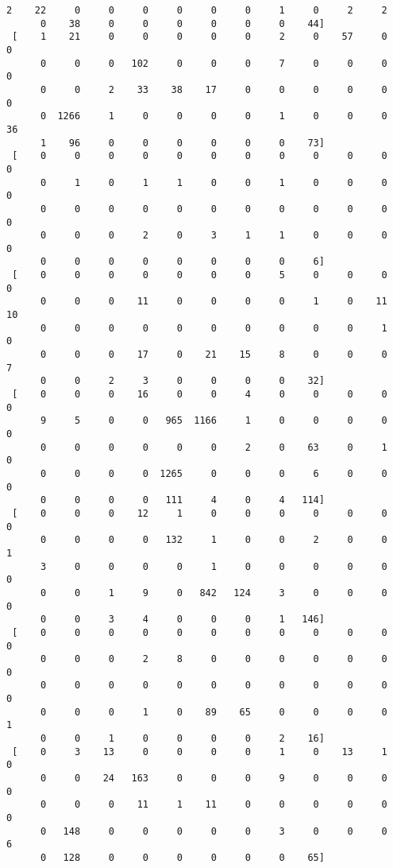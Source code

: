 \documentclass[11pt]{article}
\begin{document}
\begin{Verbatim}[commandchars=\\\{\}]
      2    22     0     0     0     0     0     0     1     0     2     2
      0    38     0     0     0     0     0     0    44]
 [    1    21     0     0     0     0     0     2     0    57     0     0
      0     0     0   102     0     0     0     7     0     0     0     0
      0     0     2    33    38    17     0     0     0     0     0     0
      0  1266     1     0     0     0     0     1     0     0     0    36
      1    96     0     0     0     0     0     0    73]
 [    0     0     0     0     0     0     0     0     0     0     0     0
      0     1     0     1     1     0     0     1     0     0     0     0
      0     0     0     0     0     0     0     0     0     0     0     0
      0     0     0     2     0     3     1     1     0     0     0     0
      0     0     0     0     0     0     0     0     6]
 [    0     0     0     0     0     0     0     5     0     0     0     0
      0     0     0    11     0     0     0     0     1     0    11    10
      0     0     0     0     0     0     0     0     0     0     1     0
      0     0     0    17     0    21    15     8     0     0     0     7
      0     0     2     3     0     0     0     0    32]
 [    0     0     0    16     0     0     4     0     0     0     0     0
      9     5     0     0   965  1166     1     0     0     0     0     0
      0     0     0     0     0     0     2     0    63     0     1     0
      0     0     0     0  1265     0     0     0     6     0     0     0
      0     0     0     0   111     4     0     4   114]
 [    0     0     0    12     1     0     0     0     0     0     0     0
      0     0     0     0   132     1     0     0     2     0     0     1
      3     0     0     0     0     1     0     0     0     0     0     0
      0     0     1     9     0   842   124     3     0     0     0     0
      0     0     3     4     0     0     0     1   146]
 [    0     0     0     0     0     0     0     0     0     0     0     0
      0     0     0     2     8     0     0     0     0     0     0     0
      0     0     0     0     0     0     0     0     0     0     0     0
      0     0     0     1     0    89    65     0     0     0     0     1
      0     0     1     0     0     0     0     2    16]
 [    0     3    13     0     0     0     0     1     0    13     1     0
      0     0    24   163     0     0     0     9     0     0     0     0
      0     0     0    11     1    11     0     0     0     0     0     0
      0   148     0     0     0     0     0     3     0     0     0     6
      0   128     0     0     0     0     0     0    65]

\end{Verbatim}
\end{document}
